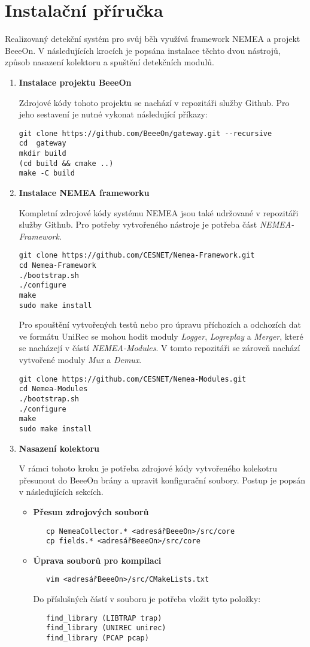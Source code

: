 \documentclass[thesis=M,czech]{FITthesis}[2012/06/26]
\begin{document}
\chapter{Instalační příručka}
Realizovaný detekční systém pro svůj běh využívá framework NEMEA a projekt BeeeOn. V následujících
krocích je popsána instalace těchto dvou nástrojů, způsob nasazení kolektoru a
spuštění detekčních modulů.

\begin{enumerate}
 \item \textbf{Instalace projektu BeeeOn}
 
 Zdrojové kódy tohoto projektu se nachází v repozitáři služby Github. Pro jeho sestavení je nutné
 vykonat následující příkazy: 
\begin{verbatim}
git clone https://github.com/BeeeOn/gateway.git --recursive
cd  gateway
mkdir build
(cd build && cmake ..)
make -C build
\end{verbatim}
 \item \textbf{Instalace NEMEA frameworku}
 
Kompletní zdrojové kódy systému NEMEA jsou také udržované v repozitáři služby Github. Pro potřeby
vytvořeného nástroje je potřeba část \textit{NEMEA-Framework}.
\begin{verbatim}
git clone https://github.com/CESNET/Nemea-Framework.git
cd Nemea-Framework
./bootstrap.sh
./configure
make
sudo make install
\end{verbatim}

Pro spouštění vytvořených testů nebo pro úpravu příchozích a odchozích dat ve formátu UniRec se
mohou hodit moduly \textit{Logger}, \textit{Logreplay} a \textit{Merger}, které se nacházejí
v částí \textit{NEMEA-Modules}. V tomto 
repozitáři se zároveň nachází vytvořené moduly \textit{Mux} a \textit{Demux}.
\begin{verbatim}
git clone https://github.com/CESNET/Nemea-Modules.git
cd Nemea-Modules
./bootstrap.sh
./configure
make
sudo make install
\end{verbatim}

\item \textbf{Nasazení kolektoru}

V rámci tohoto kroku je potřeba zdrojové kódy vytvořeného kolekotru přesunout do BeeeOn brány
a upravit konfigurační soubory. Postup je popsán v následujících sekcích.
\begin{itemize}
 \item \textbf{Přesun zdrojových souborů}
\begin{verbatim}
   cp NemeaCollector.* <adresářBeeeOn>/src/core
   cp fields.* <adresářBeeeOn>/src/core
\end{verbatim}
\item \textbf{Úprava souborů pro kompilaci}
\begin{verbatim}
   vim <adresářBeeeOn>/src/CMakeLists.txt
\end{verbatim}
Do příslušných částí v souboru je potřeba vložit tyto položky: 
\begin{verbatim}
   find_library (LIBTRAP trap)
   find_library (UNIREC unirec)
   find_library (PCAP pcap)


\end{verbatim}
\end{itemize}
\end{enumerate}
\end{document}
